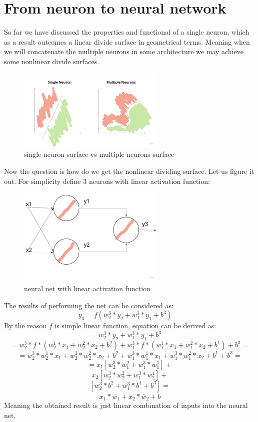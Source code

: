 \section{From neuron to neural network}
So far we have discussed the properties and functional of a single neuron, which as a result outcomes a linear divide surface in geometrical terms. Meaning when we will concatenate the multiple neurons in some architecture we may achieve some nonlinear divide surfaces.
\begin{figure}[h]
    \centering \includegraphics[width=7cm]{images/neuron_to_neural_net.jpg}
    \caption {single neuron surface vs multiple neurons surface}
\end{figure}

Now the question is how do we get the nonlinear dividing surface. Let us figure it out.
For simplicity define 3 neurons with linear activation function:
\begin{figure}[h]
    \centering \includegraphics[width=7cm]{images/3_neurons_net.jpg}
    \caption {neural net with linear activation function}
\end{figure}
The results of performing the net can be considered as:
\[ y_3 = f(w_2^3*y_2+ w_1^3*y_1+b^3) = \]
By the reason $f$ is simple linear function, equation can be derived as:
\[ = w_2^3*y_2+ w_1^3*y_1+b^3 = \] 
\[ = w_2^3*f*(w_2^1*x_1+w_2^2*x_2+b^2) + w_1^3*f*(w_1^1*x_1+w_1^2*x_2+b^1) + b^3 = \]   
\[ = w_2^3*w_2^1*x_1+w_2^3*w_2^2*x_2+b^2 + w_1^3*w_1^1*x_1+w_1^3*w_1^2*x_2+b^1+ b^3 = \]
\[ = x_1[w_2^3*w_1^2 + w_1^3*w_1^1] + \]
\[   x_2[w_2^3*w_2^2 + w_1^3*w_2^1] + \]
\[   [w_2^3*b^2 + w_1^3*b^1 + b^3]  = \]
\[   x_1*\tilde{w_1} + x_2*\tilde{w_2} + \tilde{b} \]
Meaning the obtained result is just linear combination of inputs into the neural net. 

